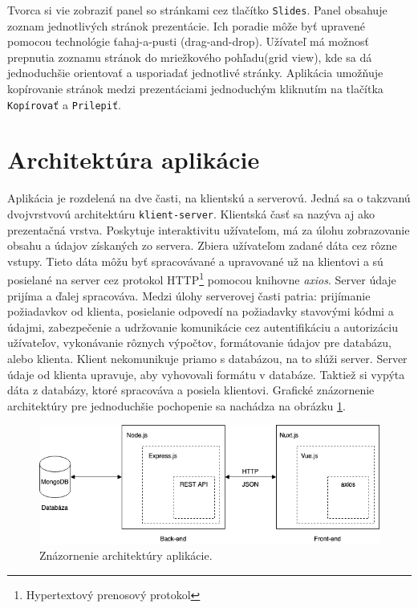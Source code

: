 Tvorca si vie zobraziť panel so stránkami cez tlačítko \texttt{Slides}. Panel obsahuje zoznam jednotlivých stránok prezentácie. Ich poradie môže byť upravené pomocou technológie ťahaj-a-pusti (drag-and-drop). Užívateľ má možnosť prepnutia zoznamu stránok do mriežkového pohľadu(grid view), kde sa dá jednoduchšie orientovať a usporiadať jednotlivé stránky. Aplikácia umožňuje kopírovanie stránok medzi prezentáciami jednoduchým kliknutím na tlačítka \texttt{Kopírovať} a \texttt{Prilepiť}.

\section{Architektúra aplikácie}
\label{architecture}
Aplikácia je rozdelená na dve časti, na klientskú a serverovú. Jedná sa o takzvanú dvojvrstvovú architektúru \texttt{klient-server}. Klientská časť sa nazýva aj ako prezentačná vrstva. Poskytuje interaktivitu užívateľom, má za úlohu zobrazovanie obsahu a údajov získaných zo servera. Zbiera užívateľom zadané dáta cez rôzne vstupy. Tieto dáta môžu byť spracovávané a upravované už na klientovi a sú posielané na server cez protokol HTTP\footnote{Hypertextový prenosový protokol} pomocou knihovne \textit{axios}. Server údaje prijíma a ďalej spracováva. Medzi úlohy serverovej časti patria: prijímanie požiadavkov od klienta, posielanie odpovedí na požiadavky stavovými kódmi a údajmi, zabezpečenie a udržovanie komunikácie cez autentifikáciu a autorizáciu užívateľov, vykonávanie rôznych výpočtov, formátovanie údajov pre databázu, alebo klienta. Klient nekomunikuje priamo s databázou, na to slúži server. Server údaje od klienta upravuje, aby vyhovovali formátu v databáze. Taktiež si vypýta dáta z databázy, ktoré spracováva a posiela klientovi. Grafické znázornenie architektúry pre jednoduchšie pochopenie sa nachádza na obrázku \ref{pic:architektura}.

    \begin{figure}[!hbt]
        \centering
        \includegraphics[scale=0.6]{obrazky/architektura.png}
        \caption{Znázornenie architektúry aplikácie.}
        \label{pic:architektura}
    \end{figure}
    
